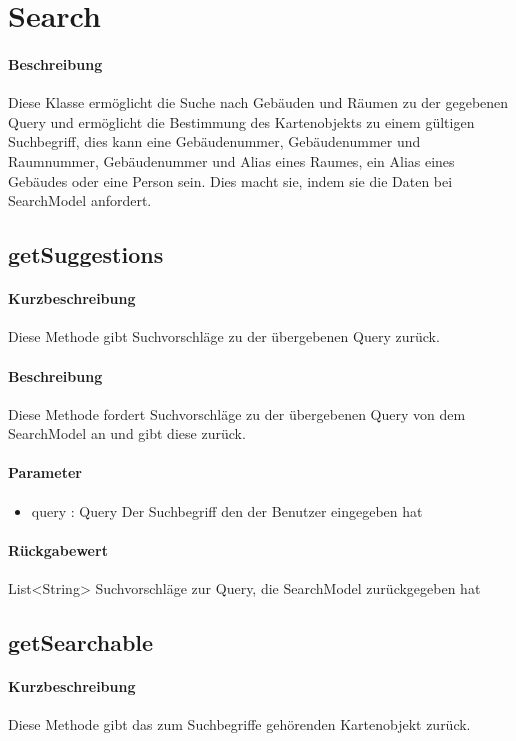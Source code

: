 \section{Search}
\paragraph*{Beschreibung}
Diese Klasse ermöglicht die Suche nach Gebäuden und Räumen zu der gegebenen Query 
und ermöglicht die Bestimmung des Kartenobjekts zu einem gültigen Suchbegriff, 
dies kann eine Gebäudenummer, Gebäudenummer und Raumnummer, Gebäudenummer und Alias eines Raumes, ein Alias eines Gebäudes oder eine Person sein.
Dies macht sie, indem sie die Daten bei SearchModel anfordert.

\subsection{getSuggestions}%
\paragraph*{Kurzbeschreibung}
Diese Methode gibt Suchvorschläge zu der übergebenen Query zurück.
\paragraph*{Beschreibung}
Diese Methode fordert Suchvorschläge zu der übergebenen Query von dem SearchModel an und gibt diese zurück.
\paragraph*{Parameter}
\begin{itemize}
    \item query : Query Der Suchbegriff den der Benutzer eingegeben hat
\end{itemize}
\paragraph*{Rückgabewert}
List<String> Suchvorschläge zur Query, die SearchModel zurückgegeben hat

\subsection{getSearchable}%
\paragraph*{Kurzbeschreibung}
Diese Methode gibt das zum Suchbegriffe gehörenden Kartenobjekt zurück.
